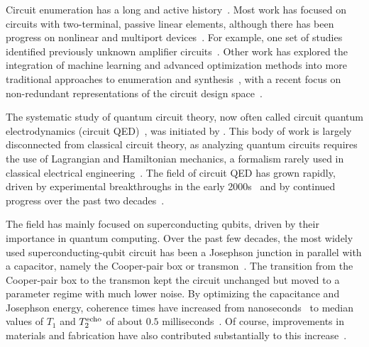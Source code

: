 Circuit enumeration has a long and active history~\cite{Kirchhoff1847a,Kirchhoff1847b,MacMahon:1890aa,Howitt:1931aa,Brune:1931aa,Brune:1931ab,Foster:1932aa,Tellegen:1940aa,RiordanShannon:1942aa,Carlitz:1956aa,Belevitch:1962aa,Mateti:1976aa,Watanabe:1999aa,Herber:2017aa,herber:2017ab,Lohan2019:aa,Morelli2019:aa}. Most work has focused on circuits with two-terminal, passive linear elements, 
although there has been progress on nonlinear and multiport devices~\cite{Happ1967,Perelson76aa,Reibiger:2013aa}. For example, one set of studies identified previously unknown amplifier circuits~\cite{Bruccoleri2001,Klumperink2001,Shahhosseini2018,Pretl2021}. Other work has explored the integration of machine learning and advanced optimization methods into more traditional approaches to enumeration and synthesis~\cite{Lyu2018,guo_circuit_2019,Zhao2022CircuitSynthesis,Fayazi2023,sirico_use_2023}, with a recent focus on non-redundant representations of the circuit design space~\cite{Gao2025AnalogGenie}.

The systematic study of quantum circuit theory, now often called circuit quantum electrodynamics (circuit QED)~\cite{blaisCircuitQuantumElectrodynamics2021a}, was initiated by \citet{YurkeDenker1984}. 
This body of work is largely disconnected from classical circuit theory, as analyzing quantum circuits requires the use of Lagrangian and Hamiltonian mechanics, a formalism rarely used in classical electrical engineering~\cite{chuaExplicitTopologicalFormulation1974,bernsteinMethodObtainingCanonical1989,weissHamiltonianFormulationComplete1997}.
The field of circuit QED has grown rapidly, driven by experimental breakthroughs in the early 2000s~\cite{bouchiat1998,nakamura1999,ManipulatingQuantumState,MartinisNam2002,ChiorescuMooij2003,WallraffSchoelkopf2004} and by continued progress over the past two decades~\cite{Schuster2007,krinner2022,google2025}.

The field has mainly focused on superconducting qubits, driven by their importance in quantum computing. Over the past few decades, the most widely used superconducting-qubit circuit has been a Josephson junction in parallel with a capacitor, namely the Cooper-pair box or transmon~\cite{bouchiat1998,kochChargeinsensitiveQubitDesign2007b}. The transition from the Cooper-pair box to the transmon kept the circuit unchanged but moved to a parameter regime with much lower noise.
By optimizing the capacitance and Josephson energy, coherence times have increased from nanoseconds~\cite{bouchiat1998}  to median values of $T_1$ and $T_2^{\rm echo}$ of about $0.5$ milliseconds~\cite{tuokkola_methods_2024}. Of course, improvements in materials and fabrication have also contributed substantially to this increase~\cite{place_new_2021, wang_towards_2022,tuokkola_methods_2024}.


